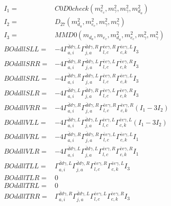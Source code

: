 \documentclass[A4,landscape]{article}
\begin{document}
\begin{align} 
I_1 = & C0D0check(m^2_{e_{{c}}}, m^2_{\gamma}, m^2_{\gamma}, m^2_{d_{{a}}}) \\ 
I_2 = & D_{27}(m^2_{d_{{a}}}, m^2_{e_{{c}}}, m^2_{\gamma}, m^2_{\gamma}) \\ 
I_3 = & MMD0(m_{d_{{a}}}, m_{e_{{c}}}, m^2_{d_{{a}}}, m^2_{e_{{c}}}, m^2_{\gamma}, m^2_{\gamma}) \\ 
  BOddllSLL= & -4  \Gamma^{\bar{d}d \gamma ,L}_{a, i} \Gamma^{\bar{d}d \gamma ,R}_{j, a} \Gamma^{\bar{e}e \gamma ,R}_{l, c} \Gamma^{\bar{e}e \gamma ,L}_{c, k} I_3 \\ 
  BOddllSRR= & -4  \Gamma^{\bar{d}d \gamma ,R}_{a, i} \Gamma^{\bar{d}d \gamma ,L}_{j, a} \Gamma^{\bar{e}e \gamma ,L}_{l, c} \Gamma^{\bar{e}e \gamma ,R}_{c, k} I_3 \\ 
  BOddllSRL= & -4  \Gamma^{\bar{d}d \gamma ,R}_{a, i} \Gamma^{\bar{d}d \gamma ,L}_{j, a} \Gamma^{\bar{e}e \gamma ,R}_{l, c} \Gamma^{\bar{e}e \gamma ,L}_{c, k} I_3 \\ 
  BOddllSLR= & -4  \Gamma^{\bar{d}d \gamma ,L}_{a, i} \Gamma^{\bar{d}d \gamma ,R}_{j, a} \Gamma^{\bar{e}e \gamma ,L}_{l, c} \Gamma^{\bar{e}e \gamma ,R}_{c, k} I_3 \\ 
  BOddllVRR= & -4  \Gamma^{\bar{d}d \gamma ,R}_{a, i} \Gamma^{\bar{d}d \gamma ,R}_{j, a} \Gamma^{\bar{e}e \gamma ,R}_{l, c} \Gamma^{\bar{e}e \gamma ,R}_{c, k} (I_1 - 3 I_2) \\ 
  BOddllVLL= & -4  \Gamma^{\bar{d}d \gamma ,L}_{a, i} \Gamma^{\bar{d}d \gamma ,L}_{j, a} \Gamma^{\bar{e}e \gamma ,L}_{l, c} \Gamma^{\bar{e}e \gamma ,L}_{c, k} (I_1 - 3 I_2) \\ 
  BOddllVRL= & -4  \Gamma^{\bar{d}d \gamma ,R}_{a, i} \Gamma^{\bar{d}d \gamma ,R}_{j, a} \Gamma^{\bar{e}e \gamma ,L}_{l, c} \Gamma^{\bar{e}e \gamma ,L}_{c, k} I_1 \\ 
  BOddllVLR= & -4  \Gamma^{\bar{d}d \gamma ,L}_{a, i} \Gamma^{\bar{d}d \gamma ,L}_{j, a} \Gamma^{\bar{e}e \gamma ,R}_{l, c} \Gamma^{\bar{e}e \gamma ,R}_{c, k} I_1 \\ 
  BOddllTLL= &  \Gamma^{\bar{d}d \gamma ,L}_{a, i} \Gamma^{\bar{d}d \gamma ,R}_{j, a} \Gamma^{\bar{e}e \gamma ,R}_{l, c} \Gamma^{\bar{e}e \gamma ,L}_{c, k} I_3 \\ 
  BOddllTLR= & 0 \\ 
  BOddllTRL= & 0 \\ 
  BOddllTRR= &  \Gamma^{\bar{d}d \gamma ,R}_{a, i} \Gamma^{\bar{d}d \gamma ,L}_{j, a} \Gamma^{\bar{e}e \gamma ,L}_{l, c} \Gamma^{\bar{e}e \gamma ,R}_{c, k} I_3 \\ 
\end{align} 
\end{document}
